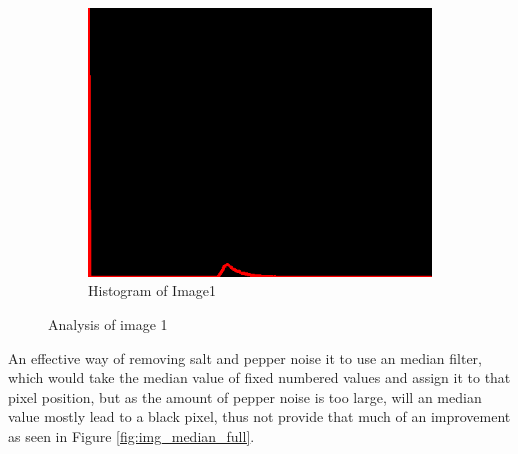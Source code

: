 \begin{figure}[H]
\begin{subfigure}[b]{0.446\textwidth}
        \includegraphics[width=\textwidth]{img1/src_hist1.png}
        \caption{Histogram of Image1}
        \label{fig:img1_hist}
    \end{subfigure}
    \caption{Analysis of image 1}\label{fig:img1}
\end{figure}

An effective way of removing salt and pepper noise it to use an median filter, which would take the median value  of fixed numbered  values and assign it to that pixel position, but as the amount of pepper noise is too large, will an median value mostly lead to a black pixel, thus not provide that much of an improvement as seen in Figure \ref{fig:img_median_full}.  

